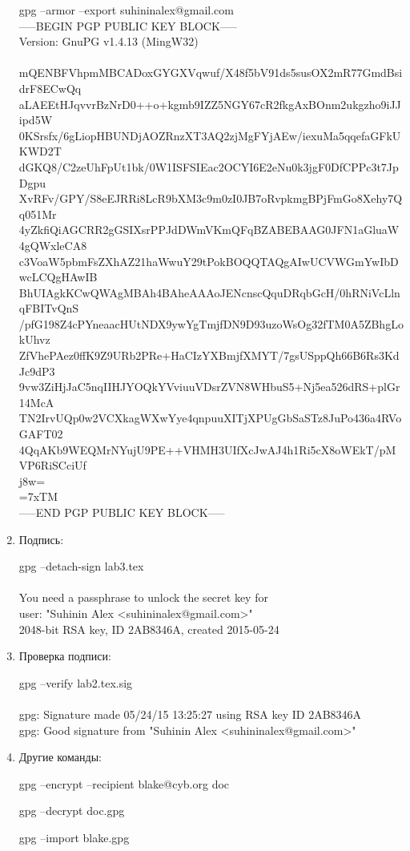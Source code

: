 \documentclass{article}
\begin{document}
\begin{enumerate}
gpg --armor --export suhininalex@gmail.com\\
-----BEGIN PGP PUBLIC KEY BLOCK-----\\
Version: GnuPG v1.4.13 (MingW32)\\
\\
mQENBFVhpmMBCADoxGYGXVqwuf/X48f5bV91ds5susOX2mR77GmdBsidrF8ECwQq\\
aLAEEtHJqvvrBzNrD0++o+kgmb9IZZ5NGY67cR2fkgAxBOnm2ukgzho9iJJipd5W\\
0KSrsfx/6gLiopHBUNDjAOZRnzXT3AQ2zjMgFYjAEw/iexuMa5qqefaGFkUKWD2T\\
dGKQ8/C2zeUhFpUt1bk/0W1ISFSIEac2OCYI6E2eNu0k3jgF0DfCPPc3t7JpDgpu\\
XvRFv/GPY/S8eEJRRi8LcR9bXM3c9m0zI0JB7oRvpkmgBPjFmGo8Xehy7Qq051Mr\\
4yZkfiQiAGCRR2gGSIXsrPPJdDWmVKmQFqBZABEBAAG0JFN1aGluaW4gQWxleCA8\\
c3VoaW5pbmFsZXhAZ21haWwuY29tPokBOQQTAQgAIwUCVWGmYwIbDwcLCQgHAwIB\\
BhUIAgkKCwQWAgMBAh4BAheAAAoJENcnscQquDRqbGcH/0hRNiVcLlnqFBITvQnS\\
/pfG198Z4cPYneaacHUtNDX9ywYgTmjfDN9D93uzoWsOg32fTM0A5ZBhgLokUhvz\\
ZfVhePAez0ffK9Z9URb2PRe+HaCIzYXBmjfXMYT/7gsUSppQh66B6Rs3KdJc9dP3\\
9vw3ZiHjJaC5nqIIHJYOQkYVviuuVDsrZVN8WHbuS5+Nj5ea526dRS+plGr14McA\\
TN2IrvUQp0w2VCXkagWXwYye4qnpuuXITjXPUgGbSaSTz8JuPo436a4RVoGAFT02\\
4QqAKb9WEQMrNYujU9PE++VHMH3UIfXcJwAJ4h1Ri5cX8oWEkT/pMVP6RiSCciUf\\
j8w=\\
=7xTM\\
-----END PGP PUBLIC KEY BLOCK-----\\

\item Подпись:

gpg --detach-sign lab3.tex\\
\\
You need a passphrase to unlock the secret key for\\
user: "Suhinin Alex <suhininalex@gmail.com>"\\
2048-bit RSA key, ID 2AB8346A, created 2015-05-24\\

\item Проверка подписи:

gpg --verify lab2.tex.sig\\
\\
gpg: Signature made 05/24/15 13:25:27 using RSA key ID 2AB8346A\\
gpg: Good signature from "Suhinin Alex <suhininalex@gmail.com>"\\


\item Другие команды:

gpg --encrypt --recipient blake@cyb.org doc

gpg --decrypt doc.gpg

gpg --import blake.gpg

\end{enumerate}
\end{document}

